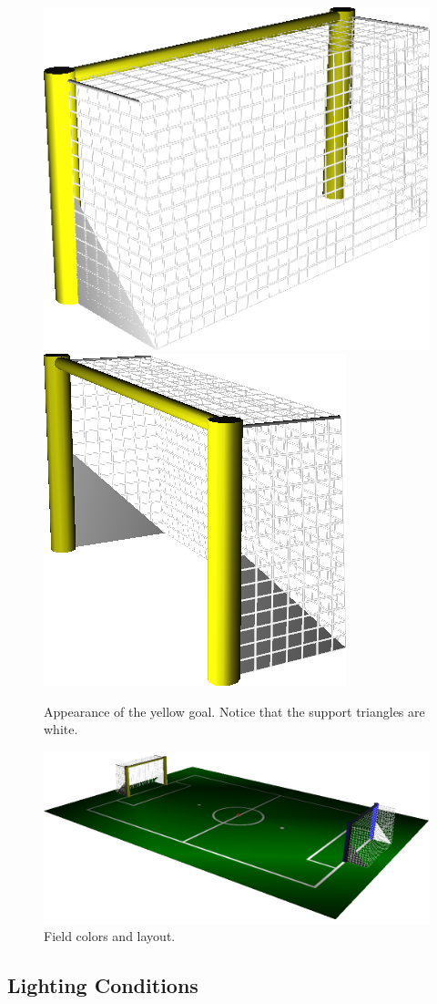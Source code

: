 \documentclass[12pt]{article}
\begin{document}
\begin{figure}[htp]
\begin{center}
\leavevmode
\includegraphics[width=0.5\columnwidth]{figs/goal_2010_back.png}
\includegraphics[width=0.4\columnwidth]{figs/goal_2010_front.png}
\caption{Appearance of the yellow goal. Notice that the support triangles are white.}
\label{fig:goal_colors}
\end{center}
\end{figure}

\begin{figure}[t]
\centerline{\includegraphics[width=\columnwidth]{figs/emptyfield_2010.png}}
\caption{Field colors and layout.}
\label{fig:field_color}
\end{figure}

\subsection{Lighting Conditions}
\end{document}

